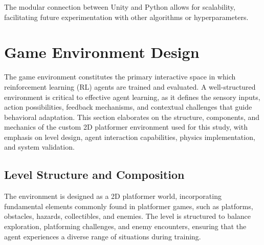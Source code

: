 \documentclass[12pt,oneside,openright,a4paper]{cpe-english-project}
\begin{document}
The modular connection between Unity and Python allows for scalability, facilitating future experimentation with other algorithms or hyperparameters.\par

\section{Game Environment Design}
The game environment constitutes the primary interactive space in which reinforcement learning (RL) agents are trained and evaluated. A well-structured environment is critical to effective agent learning, as it defines the sensory inputs, action possibilities, feedback mechanisms, and contextual challenges that guide behavioral adaptation. This section elaborates on the structure, components, and mechanics of the custom 2D platformer environment used for this study, with emphasis on level design, agent interaction capabilities, physics implementation, and system validation.
\subsection{Level Structure and Composition}
The environment is designed as a 2D platformer world, incorporating fundamental elements commonly found in platformer games, such as platforms, obstacles, hazards, collectibles, and enemies. The level is structured to balance exploration, platforming challenges, and enemy encounters, ensuring that the agent experiences a diverse range of situations during training.\par
\end{document}
